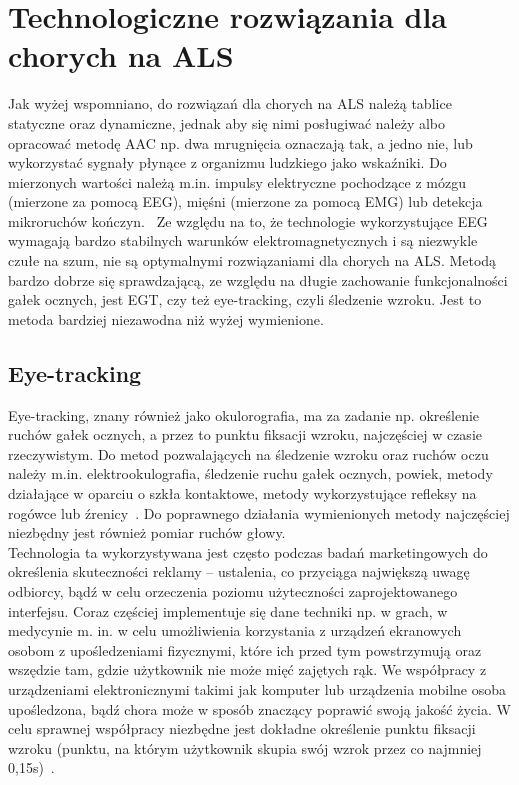 \documentclass[twoside,a4paper]{book}
\begin{document}
\section{Technologiczne rozwiązania dla chorych na ALS}

Jak wyżej wspomniano, do rozwiązań dla chorych na ALS należą tablice statyczne oraz dynamiczne, jednak aby się nimi posługiwać należy albo opracować metodę AAC  np. dwa mrugnięcia oznaczają tak, a jedno nie, lub wykorzystać sygnały płynące z organizmu ludzkiego jako wskaźniki. Do mierzonych wartości należą m.in. impulsy elektryczne pochodzące z mózgu (mierzone za pomocą EEG), mięśni (mierzone za pomocą EMG) lub detekcja mikroruchów kończyn.~\cite{eyemouse} Ze względu na to, że technologie wykorzystujące  EEG wymagają bardzo stabilnych warunków elektromagnetycznych i są niezwykle czułe na szum, nie są optymalnymi rozwiązaniami dla chorych na ALS. Metodą bardzo dobrze się sprawdzającą, ze względu na długie zachowanie funkcjonalności gałek ocznych, jest EGT, czy też eye-tracking, czyli śledzenie wzroku. Jest to metoda bardziej niezawodna niż wyżej wymienione. 
\subsection{Eye-tracking} 

Eye-tracking, znany również jako okulorografia, ma za zadanie np. określenie ruchów gałek ocznych, a przez to  punktu fiksacji wzroku,  najczęściej w czasie rzeczywistym. Do metod pozwalających na śledzenie wzroku oraz ruchów oczu należy m.in. elektrookulografia, śledzenie ruchu gałek ocznych, powiek, metody działające w oparciu o szkła kontaktowe, metody wykorzystujące refleksy na rogówce lub źrenicy~\cite{eyemouse}. Do poprawnego działania wymienionych metody naj\-częś\-ciej niezbędny jest również pomiar ruchów głowy.
\\ Technologia ta wykorzystywana jest często podczas badań marketingowych do określenia skuteczności reklamy – ustalenia, co przyciąga największą uwagę odbiorcy, bądź w celu orzeczenia poziomu użyteczności zaprojektowanego interfejsu.
Coraz częściej implementuje się dane techniki  np. w grach,  w medycynie m. in. w celu umożliwienia korzystania z urządzeń ekranowych osobom z upośledzeniami fizycznymi, które ich przed tym powstrzymują oraz wszędzie tam, gdzie użytkownik nie może mięć zajętych rąk. We współpracy z urządzeniami elektronicznymi takimi jak  komputer lub urządzenia mobilne osoba upośledzona, bądź chora może w sposób znaczący poprawić swoją jakość życia. W celu sprawnej współpracy niezbędne jest dokładne określenie punktu fiksacji wzroku (punktu, na którym użytkownik skupia swój wzrok przez co najmniej 0,15s)~\cite{kunkaUwaga}.
\end{document}
